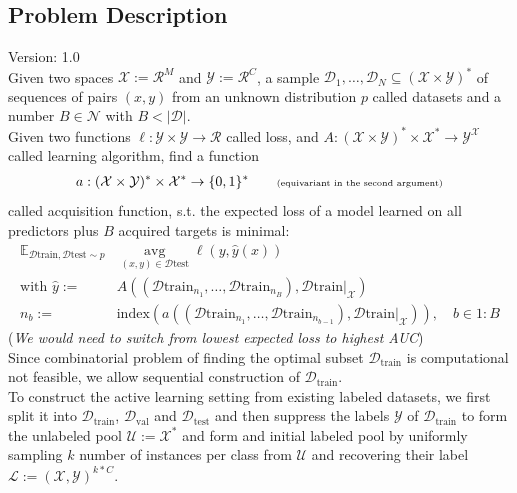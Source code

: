 \documentclass[]{article}
\begin{document}
\subsection{Problem Description}
{\color{red} Version: 1.0}\\
Given two spaces $\mathcal{X}:=\mathcal{R}^M$ and $\mathcal{Y}:=\mathcal{R}^C$, a sample $\mathcal{D}_1,\ldots,\mathcal{D}_N \subseteq (\mathcal{X}\times \mathcal{Y})^*$ of sequences of pairs $(x,y)$  from an unknown distribution $p$ called datasets and a number $B\in\mathcal{N}$ with $B < |\mathcal{D}|$. \\
Given two functions $\ell:\mathcal{Y}\times \mathcal{Y}\rightarrow \mathcal{R}$ called loss, and $A: (\mathcal{X} \times \mathcal{Y})^* \times \mathcal{X}^* \rightarrow \mathcal{Y}^{\mathcal{X}}$ called learning algorithm, find a function
\begin{align*}
	a: (\mathcal{X}\times \mathcal{Y})^* \times \mathcal{X}^* \rightarrow \{0,1\}^*
	\quad\quad \text{\tiny (equivariant in the second argument)}
\end{align*}
called acquisition function, s.t. the expected loss of a model learned on all predictors plus $B$ acquired targets is minimal:
\begin{align*}
	\mathbb{E}_{\mathcal{D}\text{train},\mathcal{D}\text{test}\sim p}   &
	\operatorname{avg}\limits_{(x,y)\in\mathcal{D}\text{test}}
	\ell(y, \hat y(x)) 
	\\
	\text{with }
	\hat y:= & A( (\mathcal{D}\text{train}_{n_1},\ldots,\mathcal{D}\text{train}_{n_B}), \mathcal{D}\text{train}|_{\mathcal{X}})
	\\ 
	n_b := & \text{index}( a( (\mathcal{D}\text{train}_{n_1},\ldots,\mathcal{D}\text{train}_{n_{b-1}}), \mathcal{D}\text{train}|_{\mathcal{X}}) ),
	\quad b\in 1{:}B
\end{align*}
(\textit{We would need to switch from lowest expected loss to highest AUC}) \\
Since combinatorial problem of finding the optimal subset $\mathcal{D}_\text{train}$ is computational not feasible, we allow sequential construction of $\mathcal{D}_\text{train}$. \\
%
To construct the active learning setting from existing labeled datasets, we first split it into $\mathcal{D}_\text{train}$, $\mathcal{D}_\text{val}$ and $\mathcal{D}_\text{test}$ and then suppress the labels $\mathcal{Y}$ of $\mathcal{D}_\text{train}$ to form the unlabeled pool $\mathcal{U} := \mathcal{X}^*$ and form and initial labeled pool by uniformly sampling $k$ number of instances per class from $\mathcal{U}$ and recovering their label $\mathcal{L} := (\mathcal{X}, \mathcal{Y})^{k*C}$. \\
\end{document}
